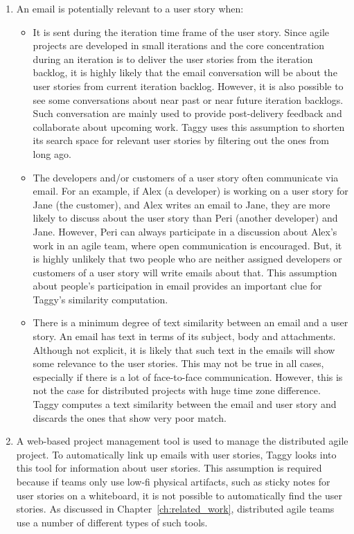 \begin{enumerate}
	\item An email is potentially relevant to a user story when:
		\begin{itemize}
			\item It is sent during the iteration time frame of the user story. Since agile projects are developed in small iterations and the core concentration during an iteration is to deliver the user stories from the iteration backlog, it is highly likely that the email conversation will be about the user stories from current iteration backlog. However, it is also possible to see some conversations about near past or near future iteration backlogs. Such conversation are mainly used to provide post-delivery feedback and collaborate about upcoming work. Taggy uses this assumption to shorten its search space for relevant user stories by filtering out the ones from long ago.
			
			\item The developers and/or customers of a user story often communicate via email. For an example, if Alex (a developer) is working on a user story for Jane (the customer), and Alex writes an email to Jane, they are more likely to discuss about the user story than Peri (another developer) and Jane. However, Peri can always participate in a discussion about Alex's work in an agile team, where open communication is encouraged. But, it is highly unlikely that two people who are neither assigned developers or customers of a user story will write emails about that. This assumption about people's participation in email provides an important clue for Taggy's similarity computation.
			
			\item There is a minimum degree of text similarity between an email and a user story. An email has text in terms of its subject, body and attachments. Although not explicit, it is likely that such text in the emails will show some relevance to the user stories. This may not be true in all cases, especially if there is a lot of face-to-face communication. However, this is not the case for distributed projects with huge time zone difference. Taggy computes a text similarity between the email and user story and discards the ones that show very poor match.
		\end{itemize}
	 \item A web-based project management tool is used to manage the distributed agile project. To automatically link up emails with user stories, Taggy looks into this tool for information about user stories. This assumption is required because if teams only use low-fi physical artifacts, such as sticky notes for user stories on a whiteboard, it is not possible to automatically find the user stories. As discussed in Chapter~\ref{ch:related_work}, distributed agile teams use a number of different types of such tools.
	

\end{enumerate}
